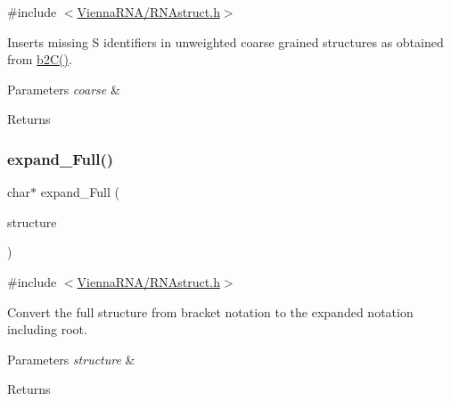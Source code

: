 {\ttfamily \#include $<$\mbox{\hyperlink{_r_n_astruct_8h}{Vienna\+R\+N\+A/\+R\+N\+Astruct.\+h}}$>$}



Inserts missing \textquotesingle{}S\textquotesingle{} identifiers in unweighted coarse grained structures as obtained from \mbox{\hyperlink{group__struct__utils_ga9c80d92391f2833549a8b6dac92233f0}{b2\+C()}}. 


\begin{DoxyParams}{Parameters}
{\em coarse} & \\
\hline
\end{DoxyParams}
\begin{DoxyReturn}{Returns}

\end{DoxyReturn}
\mbox{\label{group__struct__utils_ga78d73cd54a068ef2812812771cdddc6f}} 
\subsubsection{\texorpdfstring{expand\+\_\+\+Full()}{expand\_Full()}}
{\footnotesize\ttfamily char$\ast$ expand\+\_\+\+Full (\begin{DoxyParamCaption}\item[{const char $\ast$}]{structure }\end{DoxyParamCaption})}



{\ttfamily \#include $<$\mbox{\hyperlink{_r_n_astruct_8h}{Vienna\+R\+N\+A/\+R\+N\+Astruct.\+h}}$>$}



Convert the full structure from bracket notation to the expanded notation including root. 


\begin{DoxyParams}{Parameters}
{\em structure} & \\
\hline
\end{DoxyParams}
\begin{DoxyReturn}{Returns}

\end{DoxyReturn}
\mbox{\label{group__struct__utils_ga260c4b622093b76a883bf96628280de1}} 
